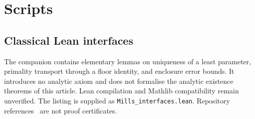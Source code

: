 \documentclass[11pt,reqno]{amsart}
\theoremstyle{blueplain}
\numberwithin{equation}{section}
\begin{document}
\section{Scripts}\label{sec:scripts}
\subsection{Classical Lean interfaces}\label{sec:scripts-lean}
The companion contains elementary lemmas on uniqueness of a least
parameter, primality transport through a floor identity, and enclosure
error bounds. It introduces no analytic axiom and does not formalise
the analytic existence theorems of this article.
Lean compilation and Mathlib compatibility remain unverified.
The listing is supplied as \texttt{Mills\_interfaces.lean}.
Repository references~\cite{FormalConjectures,MathlibGraph}
are not proof certificates.
\end{document}
